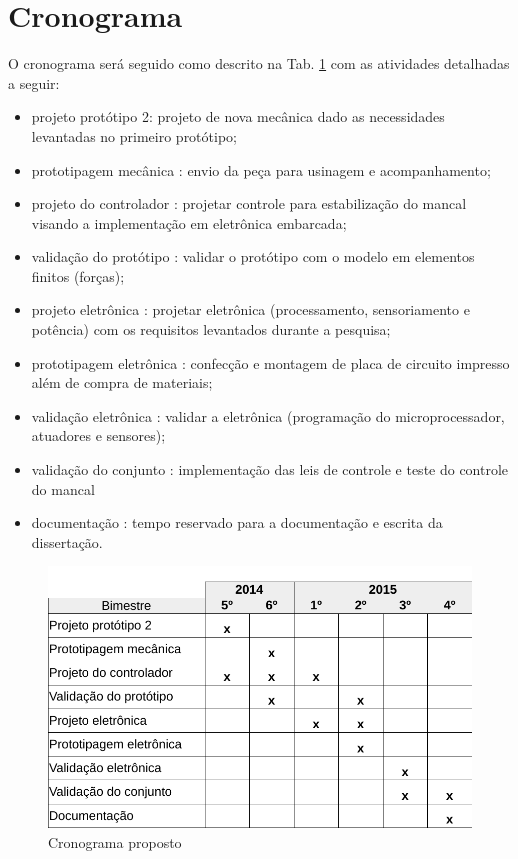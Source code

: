 \documentclass[a4paper,10pt]{report}
\begin{document}
\section*{Cronograma}

O cronograma será seguido como descrito na Tab. \ref{fig:cronograma2} com as atividades detalhadas a seguir:

\begin{itemize}
	\item projeto protótipo 2: projeto de nova mecânica dado as necessidades levantadas no primeiro protótipo;
	\item prototipagem mecânica : envio da peça para usinagem e acompanhamento;
	\item projeto do controlador : projetar controle para estabilização do mancal visando a implementação em eletrônica embarcada;
	\item validação do protótipo : validar o protótipo com o modelo em elementos finitos (forças);
	\item projeto eletrônica : projetar eletrônica (processamento, sensoriamento e potência) com os requisitos levantados durante a pesquisa;
	\item prototipagem eletrônica : confecção e montagem de placa de circuito impresso além de compra de materiais;
	\item validação eletrônica : validar a eletrônica (programação do microprocessador, atuadores e sensores);
	\item validação do conjunto : implementação das leis de controle e teste do controle do mancal
	\item documentação : tempo reservado para a documentação e escrita da dissertação.	
\end{itemize}

\begin{figure}[th!]
\centering
\includegraphics[width=1\linewidth]{./cronograma2}
\caption{Cronograma proposto}
\label{fig:cronograma2}
\end{figure}
\end{document}
